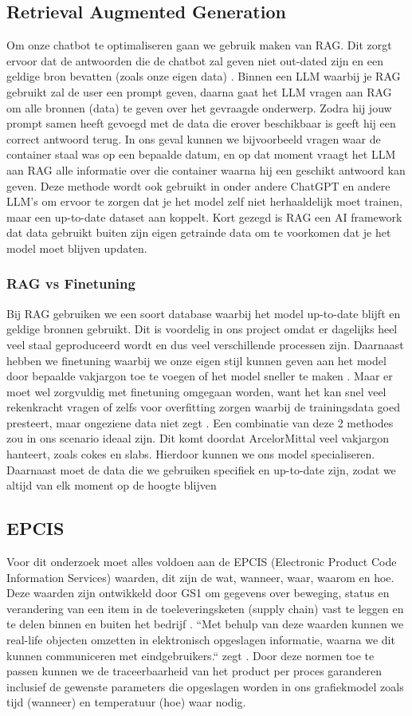 \subsection{Retrieval Augmented Generation}
Om onze chatbot te optimaliseren gaan we gebruik maken van RAG.
Dit zorgt ervoor dat de antwoorden die de chatbot zal geven niet out-dated zijn en een geldige bron bevatten (zoals onze eigen data) \autocite{IBM2023}.
Binnen een LLM waarbij je RAG gebruikt zal de user een prompt geven, daarna gaat het LLM vragen aan RAG om alle bronnen (data) te geven over het gevraagde onderwerp.
Zodra hij jouw prompt samen heeft gevoegd met de data die erover beschikbaar is geeft hij een correct antwoord terug.
In ons geval kunnen we bijvoorbeeld vragen waar de container staal was op een bepaalde datum, en op dat moment vraagt het LLM aan RAG alle informatie over die container waarna hij een geschikt antwoord kan geven.
Deze methode wordt ook gebruikt in onder andere ChatGPT en andere LLM's om ervoor te zorgen dat je het model zelf niet herhaaldelijk moet trainen, maar een up-to-date dataset aan koppelt.
Kort gezegd is RAG een AI framework dat data gebruikt buiten zijn eigen getrainde data om te voorkomen dat je het model moet blijven updaten.
\subsubsection{RAG vs Finetuning}
Bij RAG gebruiken we een soort database waarbij het model up-to-date blijft en geldige bronnen gebruikt. Dit is voordelig in ons project omdat er dagelijks heel veel staal geproduceerd wordt en dus veel verschillende processen zijn.
Daarnaast hebben we finetuning waarbij we onze eigen stijl kunnen geven aan het model door bepaalde vakjargon toe te voegen of het model sneller te maken \autocite{IBM2024}.
Maar er moet wel zorgvuldig met finetuning omgegaan worden, want het kan snel veel rekenkracht vragen of zelfs voor overfitting zorgen waarbij de trainingsdata goed presteert, maar ongeziene data niet zegt \textcite{EASIIO2022}.
Een combinatie van deze 2 methodes zou in ons scenario ideaal zijn. Dit komt doordat ArcelorMittal veel vakjargon hanteert, zoals cokes en slabs. Hierdoor kunnen we ons model specialiseren. Daarnaast moet de data die we gebruiken specifiek en up-to-date zijn, zodat we altijd van elk moment op de hoogte blijven

\subsection{EPCIS}
Voor dit onderzoek moet alles voldoen aan de EPCIS (Electronic Product Code Information Services) waarden, dit zijn de wat, wanneer, waar, waarom en hoe. 
Deze waarden zijn ontwikkeld door GS1 om gegevens over beweging, status en verandering van een item in de toeleveringsketen (supply chain) vast te leggen en te delen binnen en buiten het bedrijf \autocite{Devins}.
``Met behulp van deze waarden kunnen we real-life objecten omzetten in elektronisch opgeslagen informatie, waarna we dit kunnen communiceren met eindgebruikers.`` zegt \textcite{Devins}.
Door deze normen toe te passen kunnen we de traceerbaarheid van het product per proces garanderen inclusief de gewenste parameters die opgeslagen worden in ons grafiekmodel zoals tijd (wanneer) en temperatuur (hoe) waar nodig.
